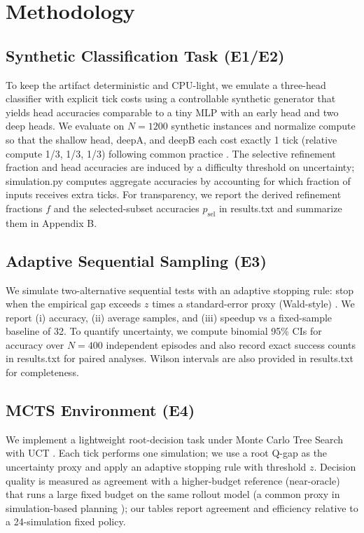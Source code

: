 \section{Methodology}
\label{sec:method}
\subsection{Synthetic Classification Task (E1/E2)}
To keep the artifact deterministic and CPU-light, we emulate a three-head classifier with explicit tick costs using a controllable synthetic generator that yields head accuracies comparable to a tiny MLP with an early head and two deep heads. We evaluate on $N=1200$ synthetic instances and normalize compute so that the shallow head, deepA, and deepB each cost exactly 1 tick (relative compute 1/3, 1/3, 1/3) following common practice \cite{Huang2018MSDNet,Wang2018SkipNet}. The selective refinement fraction and head accuracies are induced by a difficulty threshold on uncertainty; simulation.py computes aggregate accuracies by accounting for which fraction of inputs receives extra ticks. For transparency, we report the derived refinement fractions $f$ and the selected-subset accuracies $p_{\mathrm{sel}}$ in results.txt and summarize them in Appendix B.

\subsection{Adaptive Sequential Sampling (E3)}
We simulate two-alternative sequential tests with an adaptive stopping rule: stop when the empirical gap exceeds $z$ times a standard-error proxy (Wald-style) \cite{Wald1945Sequential}. We report (i) accuracy, (ii) average samples, and (iii) speedup vs a fixed-sample baseline of 32. To quantify uncertainty, we compute binomial 95\% CIs for accuracy over $N=400$ independent episodes and also record exact success counts in results.txt for paired analyses. Wilson intervals are also provided in results.txt for completeness.

\subsection{MCTS Environment (E4)}
We implement a lightweight root-decision task under Monte Carlo Tree Search with UCT \cite{Kocsis2006UCT}. Each tick performs one simulation; we use a root Q-gap as the uncertainty proxy and apply an adaptive stopping rule with threshold $z$. Decision quality is measured as agreement with a higher-budget reference (near-oracle) that runs a large fixed budget on the same rollout model (a common proxy in simulation-based planning \cite{Coulom2006MCTS}); our tables report agreement and efficiency relative to a 24-simulation fixed policy.


